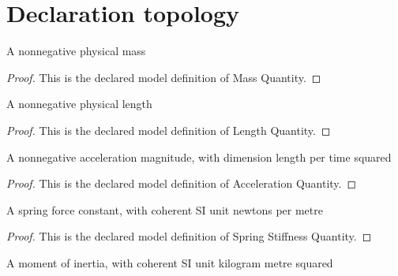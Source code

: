 \section{Declaration topology}
\begin{definition}
  \label{def:physics:phyx-mini-0232:phyxminiproblems-problemphyxmini0232-massquantity}
  A nonnegative physical mass
\end{definition}
\begin{proof}
  This is the declared model definition of Mass Quantity.
\end{proof}
\begin{definition}
  \label{def:physics:phyx-mini-0232:phyxminiproblems-problemphyxmini0232-lengthquantity}
  A nonnegative physical length
\end{definition}
\begin{proof}
  This is the declared model definition of Length Quantity.
\end{proof}
\begin{definition}
  \label{def:physics:phyx-mini-0232:phyxminiproblems-problemphyxmini0232-accelerationquantity}
  A nonnegative acceleration magnitude, with dimension length per time squared
\end{definition}
\begin{proof}
  This is the declared model definition of Acceleration Quantity.
\end{proof}
\begin{definition}
  \label{def:physics:phyx-mini-0232:phyxminiproblems-problemphyxmini0232-springstiffnessquantity}
  A spring force constant, with coherent SI unit newtons per metre
\end{definition}
\begin{proof}
  This is the declared model definition of Spring Stiffness Quantity.
\end{proof}
\begin{definition}
  \label{def:physics:phyx-mini-0232:phyxminiproblems-problemphyxmini0232-momentofinertiaquantity}
  A moment of inertia, with coherent SI unit kilogram metre squared
\end{definition}
